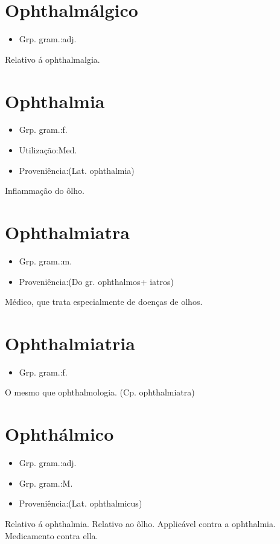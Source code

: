 \section{Ophthalmálgico}
\begin{itemize}
\item {Grp. gram.:adj.}
\end{itemize}
Relativo á ophthalmalgia.
\section{Ophthalmia}
\begin{itemize}
\item {Grp. gram.:f.}
\end{itemize}
\begin{itemize}
\item {Utilização:Med.}
\end{itemize}
\begin{itemize}
\item {Proveniência:(Lat. \textunderscore ophthalmia\textunderscore )}
\end{itemize}
Inflammação do ôlho.
\section{Ophthalmiatra}
\begin{itemize}
\item {Grp. gram.:m.}
\end{itemize}
\begin{itemize}
\item {Proveniência:(Do gr. \textunderscore ophthalmos\textunderscore  + \textunderscore iatros\textunderscore )}
\end{itemize}
Médico, que trata especialmente de doenças de olhos.
\section{Ophthalmiatria}
\begin{itemize}
\item {Grp. gram.:f.}
\end{itemize}
O mesmo que \textunderscore ophthalmologia\textunderscore .
(Cp. \textunderscore ophthalmiatra\textunderscore )
\section{Ophthálmico}
\begin{itemize}
\item {Grp. gram.:adj.}
\end{itemize}
\begin{itemize}
\item {Grp. gram.:M.}
\end{itemize}
\begin{itemize}
\item {Proveniência:(Lat. \textunderscore ophthalmicus\textunderscore )}
\end{itemize}
Relativo á ophthalmia.
Relativo ao ôlho.
Applicável contra a ophthalmia.
Medicamento contra ella.
